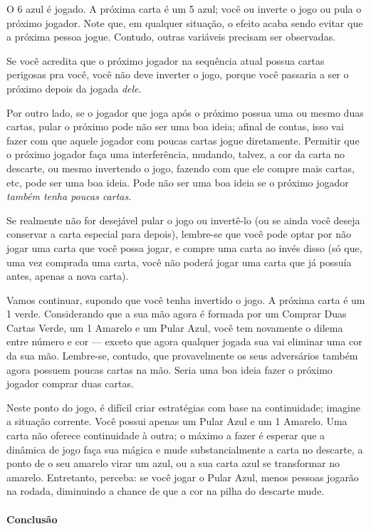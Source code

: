 O 6 azul é jogado. A próxima carta é um 5 azul; você ou inverte o jogo ou pula o próximo jogador. Note que, em qualquer situação, o efeito acaba sendo evitar que a próxima pessoa jogue. Contudo, outras variáveis precisam ser observadas.

Se você acredita que o próximo jogador na sequência atual possua cartas perigosas pra você, você não deve inverter o jogo, porque você passaria a ser o próximo depois da jogada \textit{dele}.

Por outro lado, se o jogador que joga após o próximo possua uma ou mesmo duas cartas, pular o próximo pode não ser uma boa ideia; afinal de contas, isso vai fazer com que aquele jogador com poucas cartas jogue diretamente. Permitir que o próximo jogador faça uma interferência, mudando, talvez, a cor da carta no descarte, ou mesmo invertendo o jogo, fazendo com que ele compre mais cartas, etc, pode ser uma boa ideia. Pode não ser uma boa ideia se o próximo jogador \textit{também tenha poucas cartas}.

Se realmente não for desejável pular o jogo ou invertê-lo (ou se ainda você deseja conservar a carta especial para depois), lembre-se que você pode optar por não jogar uma carta que você possa jogar, e compre uma carta ao invés disso (só que, uma vez comprada uma carta, você não poderá jogar uma carta que já possuía antes, apenas a nova carta).

Vamos continuar, supondo que você tenha invertido o jogo. A próxima carta é um 1 verde. Considerando que a sua mão agora é formada por um Comprar Duas Cartas Verde, um 1 Amarelo e um Pular Azul, você tem novamente o dilema entre número e cor --- exceto que agora qualquer jogada sua vai eliminar uma cor da sua mão. Lembre-se, contudo, que provavelmente os seus adversários também agora possuem poucas cartas na mão. Seria uma boa ideia fazer o próximo jogador comprar duas cartas.

Neste ponto do jogo, é difícil criar estratégias com base na continuidade; imagine a situação corrente. Você possui apenas um Pular Azul e um 1 Amarelo. Uma carta não oferece continuidade à outra; o máximo a fazer é esperar que a dinâmica de jogo faça sua mágica e mude substancialmente a carta no descarte, a ponto de o seu amarelo virar um azul, ou a sua carta azul se transformar no amarelo. Entretanto, perceba: se você jogar o Pular Azul, menos pessoas jogarão na rodada, diminuindo a chance de que a cor na pilha do descarte mude.

\paragraph{Conclusão}

